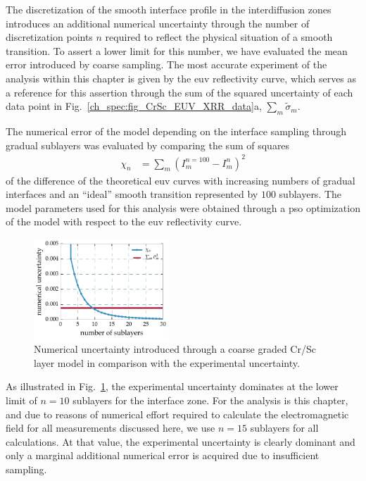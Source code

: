 The discretization of the smooth interface profile in the interdiffusion zones introduces an additional numerical uncertainty through the number of discretization points $n$ required to reflect the physical situation of a smooth transition. To assert a lower limit for this number, we have evaluated the mean error introduced by coarse sampling. The most accurate experiment of the analysis within this chapter is given by the \gls{euv} reflectivity curve, which serves as a reference for this assertion through the sum of the squared uncertainty of each data point in Fig.~\ref{ch_spec:fig_CrSc_EUV_XRR_data}a, $\sum_m \tilde{\sigma}_m$. 

The numerical error of the model depending on the interface sampling through gradual sublayers was evaluated by comparing the sum of squares
\begin{align}
\chi_n &= \sum\limits_m (I^{n=100}_m - I^n_m)^2
\end{align}
of the difference of the theoretical \gls{euv} curves with increasing numbers of gradual interfaces and an ``ideal'' smooth transition represented by $100$ sublayers. The model parameters used for this analysis were obtained through a \gls{pso} optimization of the model with respect to the \gls{euv} reflectivity curve.
\begin{figure}[htbp]
  \centering
  \includegraphics[width=0.45\textwidth]{img/CrSc_numerical_uncertainty_mixlayer}
  \caption{Numerical uncertainty introduced through a coarse graded Cr/Sc layer model in comparison with the experimental uncertainty.}
  \label{ch_spec:fig_CrSc_numerical_uncertainty_mixlayer}
\end{figure}
As illustrated in Fig.~\ref{ch_spec:fig_CrSc_numerical_uncertainty_mixlayer}, the experimental uncertainty dominates at the lower limit of $n=10$ sublayers for the interface zone.
For the analysis is this chapter, and due to reasons of numerical effort required to calculate the electromagnetic field for all measurements discussed here, we use $n=15$ sublayers for all calculations. At that value, the experimental uncertainty is clearly dominant and only a marginal additional numerical error is acquired due to insufficient sampling.

